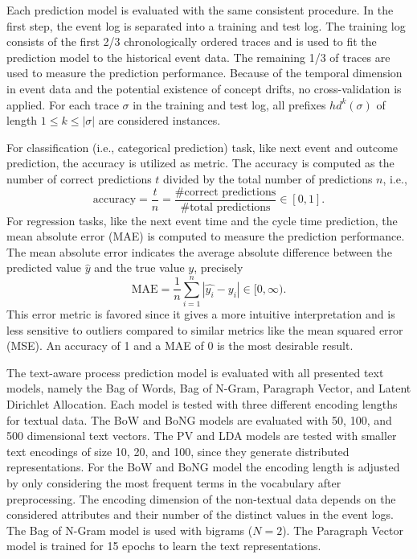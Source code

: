 Each prediction model is evaluated with the same consistent procedure.
In the first step, the event log is separated into a training and test log. 
The training log consists of the first 2/3 chronologically ordered traces and is used to fit the prediction model to the historical event data.
The remaining 1/3 of traces are used to measure the prediction performance.
Because of the temporal dimension in event data and the potential existence of concept drifts, no cross-validation is applied.
For each trace $\sigma$ in the training and test log, all prefixes $hd^k(\sigma)$ of length $1 \leq k \leq |\sigma|$ are considered instances.

For classification (i.e., categorical prediction) task, like next event and outcome prediction, the accuracy is utilized as metric.
The accuracy is computed as the number of correct predictions $t$ divided by the total number of predictions $n$, i.e., 
\begin{equation*}
	\textrm{accuracy} = \dfrac{t}{n} = \dfrac{\textrm{\# correct predictions}}{\textrm{\# total predictions}} \in [0,1].
\end{equation*}
For regression tasks, like the next event time and the cycle time prediction, the mean absolute error (MAE) is computed to measure the prediction performance. The mean absolute error indicates the average absolute difference between the predicted value $\hat{y}$ and the true value $y$,  precisely
\begin{equation*}
	\textrm{MAE} = \dfrac{1}{n}\sum_{i=1}^{n}|\hat{y_i} - y_i| \in [0, \infty).
\end{equation*}
This error metric is favored since it gives a more intuitive interpretation and is less sensitive to outliers compared to similar metrics like the mean squared error (MSE).
An accuracy of 1 and a MAE of 0 is the most desirable result.

The text-aware process prediction model is evaluated with all presented text models, namely the Bag of Words, Bag of N-Gram, Paragraph Vector, and Latent Dirichlet Allocation.
Each model is tested with three different encoding lengths for textual data.
The BoW and BoNG models are evaluated with 50, 100, and 500 dimensional text vectors.
The PV and LDA models are tested with smaller text encodings of size 10, 20, and 100, since they generate distributed representations.
For the BoW and BoNG model the encoding length is adjusted by only considering the most frequent terms in the vocabulary after preprocessing.
The encoding dimension of the non-textual data depends on the considered attributes and their number of the distinct values in the event logs.
The Bag of N-Gram model is used with bigrams ($N = 2$).
The Paragraph Vector model is trained for 15 epochs to learn the text representations.

